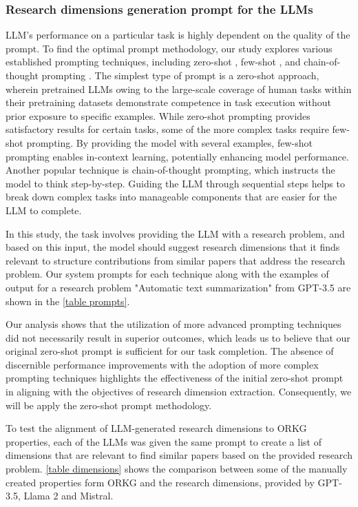 \subsubsection{Research dimensions generation prompt for the LLMs}

LLM’s performance on a particular task is highly dependent on the quality of the prompt. To find the optimal prompt methodology, our study explores various established prompting techniques, including zero-shot \cite{radford2019language}, few-shot  \cite{brown2020language}, and chain-of-thought prompting \cite{wei2022chain}. The simplest type of prompt is a zero-shot approach, wherein pretrained LLMs owing to the large-scale coverage of human tasks within their pretraining datasets demonstrate competence in task execution without prior exposure to specific examples. While zero-shot prompting provides satisfactory results for certain tasks, some of the more complex tasks require few-shot prompting. By providing the model with several examples, few-shot prompting enables in-context learning, potentially enhancing model performance. Another popular technique is chain-of-thought prompting, which instructs the model to think step-by-step. Guiding the LLM through sequential steps helps to break down complex tasks into manageable components that are easier for the LLM to complete. 

In this study, the task involves providing the LLM with a research problem, and based on this input, the model should suggest research dimensions that it finds relevant to structure contributions from similar papers that address the research problem. Our system prompts for each technique along with the examples of output for a research problem "Automatic text summarization" from GPT-3.5 are shown in the \autoref{table prompts}. 

Our analysis shows that the utilization of more advanced prompting techniques did not necessarily result in superior outcomes, which leads us to believe that our original zero-shot prompt is sufficient for our task completion. The absence of discernible performance improvements with the adoption of more complex prompting techniques highlights the effectiveness of the initial zero-shot prompt in aligning with the objectives of research dimension extraction. Consequently, we will be apply the zero-shot prompt methodology.

To test the alignment of LLM-generated research dimensions to ORKG properties, each of the LLMs was given the same prompt to create a list of dimensions that are relevant to find similar papers based on the provided research problem. \autoref{table dimensions} shows the comparison between some of the manually created properties form ORKG and the research dimensions, provided by GPT-3.5, Llama 2 and Mistral. 

